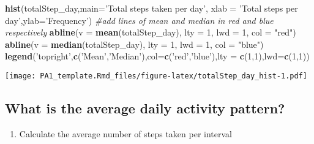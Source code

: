 \documentclass[
]{article}
\newenvironment{Shaded}{\begin{snugshade}}{\end{snugshade}}
\newcommand{\CommentTok}[1]{\textcolor[rgb]{0.56,0.35,0.01}{\textit{#1}}}
\newcommand{\DataTypeTok}[1]{\textcolor[rgb]{0.13,0.29,0.53}{#1}}
\newcommand{\DecValTok}[1]{\textcolor[rgb]{0.00,0.00,0.81}{#1}}
\newcommand{\KeywordTok}[1]{\textcolor[rgb]{0.13,0.29,0.53}{\textbf{#1}}}
\newcommand{\NormalTok}[1]{#1}
\newcommand{\OperatorTok}[1]{\textcolor[rgb]{0.81,0.36,0.00}{\textbf{#1}}}
\newcommand{\OtherTok}[1]{\textcolor[rgb]{0.56,0.35,0.01}{#1}}
\newcommand{\StringTok}[1]{\textcolor[rgb]{0.31,0.60,0.02}{#1}}
\providecommand{\tightlist}{%
  \setlength{\itemsep}{0pt}\setlength{\parskip}{0pt}}
\begin{document}
\begin{Shaded}
\begin{Highlighting}[]
\KeywordTok{hist}\NormalTok{(totalStep_day,}\DataTypeTok{main=}\StringTok{'Total steps taken per day'}\NormalTok{,}
        \DataTypeTok{xlab =} \StringTok{'Total steps per day'}\NormalTok{,}\DataTypeTok{ylab=}\StringTok{'Frequency'}\NormalTok{)}
\CommentTok{#add lines of mean and median in red and blue respectively}
\KeywordTok{abline}\NormalTok{(}\DataTypeTok{v =} \KeywordTok{mean}\NormalTok{(totalStep_day), }\DataTypeTok{lty =} \DecValTok{1}\NormalTok{, }\DataTypeTok{lwd =} \DecValTok{1}\NormalTok{, }\DataTypeTok{col =} \StringTok{"red"}\NormalTok{)}
\KeywordTok{abline}\NormalTok{(}\DataTypeTok{v =} \KeywordTok{median}\NormalTok{(totalStep_day), }\DataTypeTok{lty =} \DecValTok{1}\NormalTok{, }\DataTypeTok{lwd =} \DecValTok{1}\NormalTok{, }\DataTypeTok{col =} \StringTok{"blue"}\NormalTok{)}
\KeywordTok{legend}\NormalTok{(}\StringTok{'topright'}\NormalTok{,}\KeywordTok{c}\NormalTok{(}\StringTok{'Mean'}\NormalTok{,}\StringTok{'Median'}\NormalTok{),}\DataTypeTok{col=}\KeywordTok{c}\NormalTok{(}\StringTok{'red'}\NormalTok{,}\StringTok{'blue'}\NormalTok{),}\DataTypeTok{lty =} \KeywordTok{c}\NormalTok{(}\DecValTok{1}\NormalTok{,}\DecValTok{1}\NormalTok{),}\DataTypeTok{lwd=}\KeywordTok{c}\NormalTok{(}\DecValTok{1}\NormalTok{,}\DecValTok{1}\NormalTok{))}
\end{Highlighting}
\end{Shaded}

\texttt{[image: PA1\_template.Rmd\_files/figure-latex/totalStep\_day\_hist-1.pdf]}

\hypertarget{what-is-the-average-daily-activity-pattern}{%
\subsection{What is the average daily activity
pattern?}\label{what-is-the-average-daily-activity-pattern}}

\begin{enumerate}
\def\labelenumi{\arabic{enumi}.}
\tightlist
\item
  Calculate the average number of steps taken per interval
\end{enumerate}

\begin{Shaded}
\end{Shaded}
\end{document}
